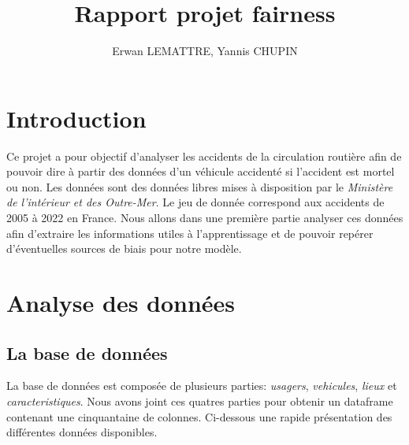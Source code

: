 \documentclass[]{article}
\author{Erwan LEMATTRE, Yannis CHUPIN}
\title{Rapport projet fairness}
\begin{document}
    \tableofcontents
    \newpage

    \section{Introduction}
    Ce projet a pour objectif d'analyser les accidents de la circulation routière afin de pouvoir dire 
    à partir des données d'un véhicule accidenté si l'accident est mortel ou non.
    Les données sont des données libres mises à disposition par le \textit{Ministère de l'intérieur et des 
    Outre-Mer}. Le jeu de donnée correspond aux accidents de 2005 à 2022 en France. Nous allons dans une première 
    partie analyser ces données afin d'extraire les informations utiles à l'apprentissage et de pouvoir repérer 
    d'éventuelles sources de biais pour notre modèle.

    \section{Analyse des données}
    \subsection{La base de données}
    La base de données est composée de plusieurs parties: \textit{usagers}, \textit{vehicules}, \textit{lieux} et 
    \textit{caracteristiques}. Nous avons joint ces quatres parties pour obtenir un dataframe contenant une 
    cinquantaine de colonnes. 
    Ci-dessous une rapide présentation des différentes données disponibles.
\end{document}
